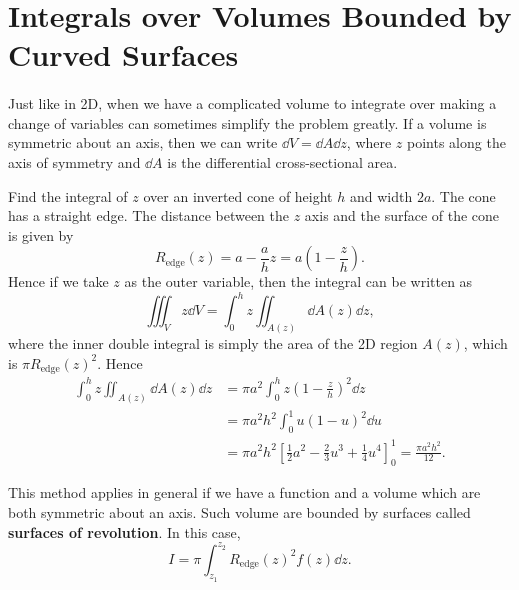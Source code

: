 \documentclass[../multivariate_calculus.tex]{subfiles}
\begin{document}
    \section{Integrals over Volumes Bounded by Curved Surfaces}
        \paragraph{}
        Just like in 2D, when we have a complicated volume to integrate over making a change of variables can sometimes simplify the problem greatly.
        If a volume is symmetric about an axis, then we can write $\dd{V}=\dd{A}\dd{z}$, where $z$ points along the axis of symmetry and $\dd{A}$ is the differential cross-sectional area.
        \begin{example}
            Find the integral of $z$ over an inverted cone of height $h$ and width $2a$.
            The cone has a straight edge. The distance between the $z$ axis and the surface of the cone is given by
            \begin{equation}
                R_\text{edge}(z)=a-\frac{a}{h}z=a\left(1-\frac{z}{h}\right).
            \end{equation}
            Hence if we take $z$ as the outer variable, then the integral can be written as
            \begin{equation}
                \iiint_V z\dd{V}=\int_0^h z\iint_{A(z)}\dd{A}(z)\dd{z},
            \end{equation}
            where the inner double integral is simply the area of the 2D region $A(z)$, which is $\pi R_\text{edge}(z)^2$.
            Hence
            \begin{align}
                \int_0^h z\iint_{A(z)}\dd{A}(z)\dd{z}&=\pi a^2\int_0^h z\left(1-\frac{z}{h}\right)^2\dd{z}\\
                &=\pi a^2h^2\int_0^1 u(1-u)^2\dd{u}\\
                &=\pi a^2h^2\left[\frac{1}{2}a^2-\frac{2}{3}u^3+\frac{1}{4}u^4\right]_0^1=\frac{\pi a^2h^2}{12}.
            \end{align}
        \end{example}
        This method applies in general if we have a function and a volume which are both symmetric about an axis.
        Such volume are bounded by surfaces called \textbf{surfaces of revolution}.
        In this case,
        \begin{equation}
            I=\pi\int_{z_1}^{z_2}R_\text{edge}(z)^2 f(z)\dd{z}.
        \end{equation}
\end{document}
